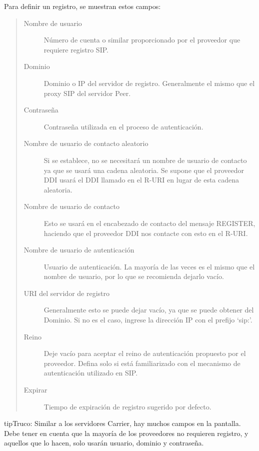 \documentclass[letterpaper,10pt,spanish]{sphinxmanual}
\begin{document}
Para definir un registro, se muestran estos campos:
\begin{quote}
\begin{description}
\item[{Nombre de usuario}] \leavevmode
Número de cuenta o similar proporcionado por el proveedor que requiere registro SIP.

\item[{Dominio}] \leavevmode
Dominio o IP del servidor de registro. Generalmente el mismo que el proxy SIP del servidor Peer.

\item[{Contraseña}] \leavevmode
Contraseña utilizada en el proceso de autenticación.

\item[{Nombre de usuario de contacto aleatorio}] \leavevmode
Si se establece, no se necesitará un nombre de usuario de contacto ya que se usará una cadena aleatoria. Se supone que el proveedor DDI usará el DDI llamado en el R-URI en lugar de esta cadena aleatoria.

\item[{Nombre de usuario de contacto}] \leavevmode
Esto se usará en el encabezado de contacto del mensaje REGISTER, haciendo que el proveedor DDI nos contacte con esto en el R-URI.

\item[{Nombre de usuario de autenticación}] \leavevmode
Usuario de autenticación. La mayoría de las veces es el mismo que el nombre de usuario, por lo que se recomienda dejarlo vacío.

\item[{URI del servidor de registro}] \leavevmode
Generalmente esto se puede dejar vacío, ya que se puede obtener del Dominio. Si no es el caso, ingrese la dirección IP con el prefijo `sip:'.

\item[{Reino}] \leavevmode
Deje vacío para aceptar el reino de autenticación propuesto por el proveedor. Defina solo si está familiarizado con el mecanismo de autenticación utilizado en SIP.

\item[{Expirar}] \leavevmode
Tiempo de expiración de registro sugerido por defecto.

\end{description}
\end{quote}

\begin{notice}{tip}{Truco:}
Similar a los servidores Carrier, hay muchos campos en la pantalla. Debe tener en cuenta que la mayoría de los proveedores no requieren registro, y aquellos que lo hacen, solo usarán usuario, dominio y contraseña.
\end{notice}
\end{document}
